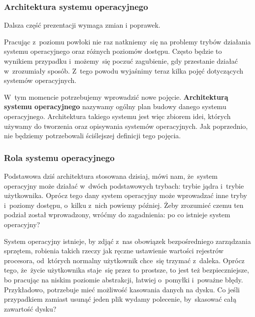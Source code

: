 \documentclass[10pt,t]{beamer}
\begin{document}
\begin{frame}
  \frametitle{Architektura systemu operacyjnego}


  \alert{Dalsza część prezentacji wymaga zmian i poprawek.}

  Pracując z~poziomu powłoki nie raz natkniemy~się na problemy
  trybów działania systemu operacyjnego oraz różnych poziomów dostępu.
  Często będzie to wynikiem przypadku i~możemy~się poczuć zagubienie,
  gdy przestanie działać w~zrozumiały sposób. Z~tego powodu wyjaśnimy teraz
  kilka pojęć dotyczących systemów operacyjnych.

  W~tym momencie potrzebujemy wprowadzić nowe pojęcie.
  \textbf{Architekturą systemu operacyjnego} nazywamy ogólny plan budowy
  danego systemu operacyjnego. Architektura takiego systemu jest więc
  zbiorem idei, których używamy do tworzenia oraz opisywania systemów
  operacyjnych. Jak poprzednio, nie będziemy potrzebowali ściślejszej
  definicji tego pojęcia.

\end{frame}





\begin{frame}
  \frametitle{Rola systemu operacyjnego}


  Podstawowa dziś architektura stosowana dzisiaj, mówi nam, że~system
  operacyjny może działać w~dwóch podstawowych trybach: trybie jądra
  i~trybie użytkownika. Oprócz tego dany system operacyjny może wprowadzać
  inne tryby i~poziomy dostępu, o~kilku z~nich powiemy później. Żeby
  zrozumieć czemu ten podział został wprowadzony, wróćmy do zagadnienia:
  po co istnieje system operacyjny?

  System operacyjny istnieje, by zdjąć z~nas obowiązek bezpośredniego
  zarządzania sprzętem, robienia takich rzeczy jak ręczne ustawienie
  wartości rejestrów procesora, od~których normalny użytkownik chce~się
  trzymać z~daleka. Oprócz tego, że~życie użytkownika staje~się przez to
  prostsze,
  to jest też bezpieczniejsze, bo pracując na niskim poziomie abstrakcji,
  łatwiej o~pomyłki i~poważne błędy. Przykładowo, potrzebuje mieć możliwość
  kasowania danych na dysku. Co jeśli przypadkiem zamiast usunąć jeden
  plik wydamy polecenie, by~skasować całą zawartość dysku?

\end{frame}
\end{document}
